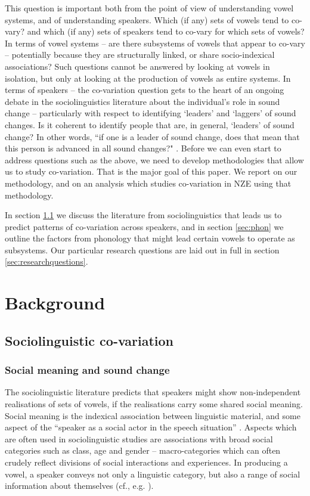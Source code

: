 \documentclass[review]{elsarticle} %
\begin{document}
This question is important both from the point of view of understanding vowel systems, and of understanding speakers.  Which (if any) sets of vowels tend to co-vary? and which (if any) sets of speakers tend to co-vary for which sets of vowels?  In terms of vowel systems – are there subsystems of vowels that appear to co-vary – potentially because they are structurally linked, or share socio-indexical associations?  Such questions cannot be answered by looking at vowels in isolation, but only at looking at the production of vowels as entire systems. In terms of speakers – the co-variation question gets to the heart of an ongoing debate in the sociolinguistics literature about the individual’s role in sound change – particularly with respect to identifying `leaders’ and `laggers’ of sound changes.  Is it coherent to identify people that are, in general, `leaders’ of sound change?  In other words, ``if one is a leader of sound change, does that mean that this person is advanced in all sound changes?" \citep{guy2016linguistic}.  Before we can even start to address questions such as the above, we need to develop methodologies that allow us to study co-variation.  That is the major goal of this paper.  We report on our methodology, and on an analysis which studies co-variation in NZE using that methodology.

In section \ref{sec:socio} we discuss the literature from sociolinguistics that leads us to predict patterns of co-variation across speakers, and in section \ref{sec:phon} we outline the factors from phonology that might lead certain vowels to operate as subsystems.   Our particular research questions are laid out in full in section \ref{sec:researchquestions}.

\label{sec:background}
\section{Background}
\subsection{Sociolinguistic co-variation}\label{sec:socio}
\subsubsection{Social meaning and sound change}
The sociolinguistic literature predicts that speakers might show non-independent realisations of sets of vowels, if the realisations carry some shared social meaning.
Social meaning is the indexical association between linguistic material, and some aspect of the “speaker as a social actor in the speech situation” \citep{eckertlabov2017}.   Aspects which are often used in sociolinguistic studies are associations with broad social categories such as class, age and gender --  macro-categories  which can often crudely reflect divisions of social interactions and experiences.  In producing a vowel, a speaker conveys not only a linguistic category, but also a range of social information about themselves (cf., e.g. \citealt{campbell2010sociolinguistic, eckert2018meaning}).
\end{document}
